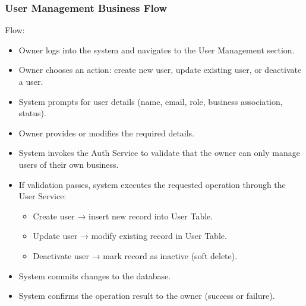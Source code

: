 \documentclass[]{VUMIFTemplateClass}
\begin{document}
\newpage
\subsubsection{User Management Business Flow}

Flow:
\begin{itemize}
\setlength{\itemsep}{2pt}
\setlength{\parskip}{0pt}
\setlength{\parsep}{0pt}
\item Owner logs into the system and navigates to the User Management section.
\item Owner chooses an action: create new user, update existing user, or deactivate a user.
\item System prompts for user details (name, email, role, business association, status).
\item Owner provides or modifies the required details.
\item System invokes the Auth Service to validate that the owner can only manage users of their own business.
\item If validation passes, system executes the requested operation through the User Service:
\begin{itemize}
\item Create user → insert new record into User Table.
\item Update user → modify existing record in User Table.
\item Deactivate user → mark record as inactive (soft delete).
\end{itemize}
\item System commits changes to the database.
\item System confirms the operation result to the owner (success or failure).
\end{itemize}
\end{document}
